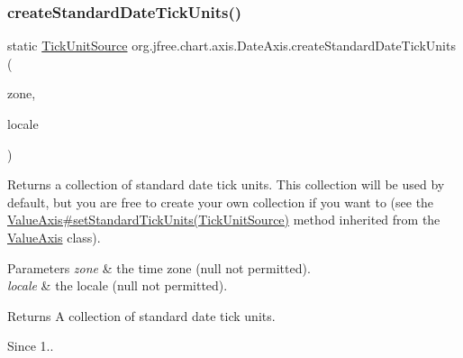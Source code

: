 \subsubsection{\texorpdfstring{create\+Standard\+Date\+Tick\+Units()}{createStandardDateTickUnits()}\hspace{0.1cm}{\footnotesize\ttfamily [2/3]}}
{\footnotesize\ttfamily static \mbox{\hyperlink{interfaceorg_1_1jfree_1_1chart_1_1axis_1_1_tick_unit_source}{Tick\+Unit\+Source}} org.\+jfree.\+chart.\+axis.\+Date\+Axis.\+create\+Standard\+Date\+Tick\+Units (\begin{DoxyParamCaption}\item[{Time\+Zone}]{zone,  }\item[{Locale}]{locale }\end{DoxyParamCaption})\hspace{0.3cm}{\ttfamily [static]}}

Returns a collection of standard date tick units. This collection will be used by default, but you are free to create your own collection if you want to (see the \mbox{\hyperlink{classorg_1_1jfree_1_1chart_1_1axis_1_1_value_axis_ac84e1ffa28cdea7b355306ae472d21a2}{Value\+Axis\#set\+Standard\+Tick\+Units(\+Tick\+Unit\+Source)}} method inherited from the \mbox{\hyperlink{classorg_1_1jfree_1_1chart_1_1axis_1_1_value_axis}{Value\+Axis}} class).


\begin{DoxyParams}{Parameters}
{\em zone} & the time zone ({\ttfamily null} not permitted). \\
\hline
{\em locale} & the locale ({\ttfamily null} not permitted).\\
\hline
\end{DoxyParams}
\begin{DoxyReturn}{Returns}
A collection of standard date tick units.
\end{DoxyReturn}
\begin{DoxySince}{Since}
1.. 
\end{DoxySince}
\mbox{\label{classorg_1_1jfree_1_1chart_1_1axis_1_1_date_axis_abcd4333dbc49642ee7dc4639c13a032c}} 
